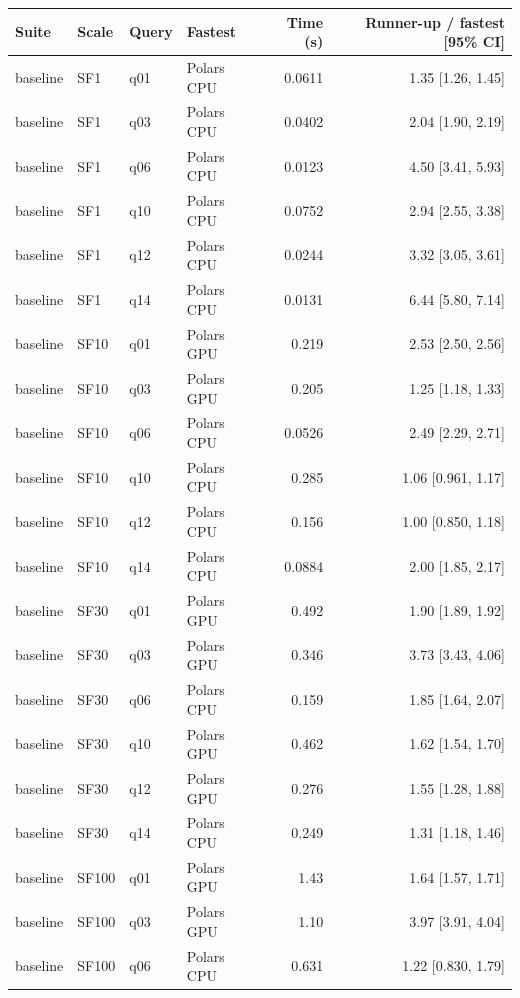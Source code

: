 \begin{longtable}{llllrr}
\toprule
Suite & Scale & Query & Fastest & Time (s) & Runner-up / fastest [95\% CI] \\
\midrule
\endhead
\bottomrule
\endfoot
baseline & SF1 & q01 & Polars CPU & 0.0611 & 1.35 [1.26, 1.45] \\
baseline & SF1 & q03 & Polars CPU & 0.0402 & 2.04 [1.90, 2.19] \\
baseline & SF1 & q06 & Polars CPU & 0.0123 & 4.50 [3.41, 5.93] \\
baseline & SF1 & q10 & Polars CPU & 0.0752 & 2.94 [2.55, 3.38] \\
baseline & SF1 & q12 & Polars CPU & 0.0244 & 3.32 [3.05, 3.61] \\
baseline & SF1 & q14 & Polars CPU & 0.0131 & 6.44 [5.80, 7.14] \\
baseline & SF10 & q01 & Polars GPU & 0.219 & 2.53 [2.50, 2.56] \\
baseline & SF10 & q03 & Polars GPU & 0.205 & 1.25 [1.18, 1.33] \\
baseline & SF10 & q06 & Polars CPU & 0.0526 & 2.49 [2.29, 2.71] \\
baseline & SF10 & q10 & Polars CPU & 0.285 & 1.06 [0.961, 1.17] \\
baseline & SF10 & q12 & Polars CPU & 0.156 & 1.00 [0.850, 1.18] \\
baseline & SF10 & q14 & Polars CPU & 0.0884 & 2.00 [1.85, 2.17] \\
baseline & SF30 & q01 & Polars GPU & 0.492 & 1.90 [1.89, 1.92] \\
baseline & SF30 & q03 & Polars GPU & 0.346 & 3.73 [3.43, 4.06] \\
baseline & SF30 & q06 & Polars CPU & 0.159 & 1.85 [1.64, 2.07] \\
baseline & SF30 & q10 & Polars GPU & 0.462 & 1.62 [1.54, 1.70] \\
baseline & SF30 & q12 & Polars GPU & 0.276 & 1.55 [1.28, 1.88] \\
baseline & SF30 & q14 & Polars CPU & 0.249 & 1.31 [1.18, 1.46] \\
baseline & SF100 & q01 & Polars GPU & 1.43 & 1.64 [1.57, 1.71] \\
baseline & SF100 & q03 & Polars GPU & 1.10 & 3.97 [3.91, 4.04] \\
baseline & SF100 & q06 & Polars CPU & 0.631 & 1.22 [0.830, 1.79] \\

\end{longtable}
